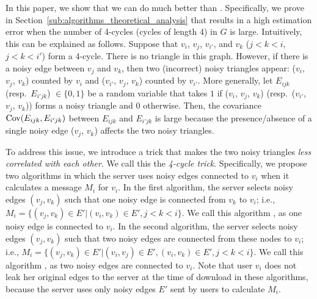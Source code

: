 In this paper,
we show that we can do much better
than \AlgOne{}.
Specifically, we prove in Section~\ref{sub:algorithms_theoretical_analysis} that \AlgOne{} results in a high estimation error when the number of 4-cycles (cycles of length 4) in $G$ is large.
Intuitively, this can be explained as follows.
Suppose that $v_i$, $v_j$, $v_{i'}$, and $v_k$
($j<k<i$, $j<k<i'$)
form a 4-cycle. 
There is no triangle in this graph.
However, if there is a noisy edge between $v_j$ and $v_k$, then two (incorrect) noisy triangles appear: ($v_i$, $v_j$, $v_k$) counted by $v_i$ and ($v_{i'}$, $v_j$, $v_k$) counted by $v_{i'}$.
More generally, let $E_{ijk}$ (resp.~$E_{i'jk}$) $\in \{0,1\}$ be a random variable that takes $1$ if ($v_i$, $v_j$, $v_k$) (resp.~($v_{i'}$, $v_j$, $v_k$)) forms a noisy triangle and $0$ otherwise.
Then, the covariance $\operatorname{\text{Cov}}(E_{ijk},E_{i'jk})$ between $E_{ijk}$ and $E_{i'jk}$ is large because the presence/absence of a single noisy edge ($v_j$, $v_k$) affects the two noisy triangles.

To address this issue, we introduce a
trick 
that makes the two noisy triangles \textit{less correlated with each other}.
We call this the \textit{4-cycle trick}.
Specifically,
we propose two algorithms in which
the server uses noisy edges connected to $v_i$ when it calculates a message $M_i$ for $v_i$.
In the first algorithm,
the server selects
noisy edges $(v_j, v_k)$ such that
one noisy edge is connected from $v_k$ to $v_i$;
i.e.,
$M_i = \{(v_j, v_k) \in E' | (v_i, v_k) \in E', j<k<i\}$.
We call this algorithm \AlgTwo{}, as one noisy edge is connected to $v_i$.
In the second algorithm,
the server selects
noisy edges $(v_j, v_k)$ such that
two noisy edges are connected from these nodes to $v_i$; i.e.,
$M_i = \{(v_j, v_k) \in E' | (v_i, v_j) \in E', (v_i, v_k) \in E', j<k<i\}$.
We call this algorithm \AlgThree{}, as two noisy edges are connected to $v_i$.
Note that user $v_i$ does not leak her original edges to the server at the time of download in these algorithms, because
the server uses only noisy edges $E'$ sent by users to calculate $M_i$.

